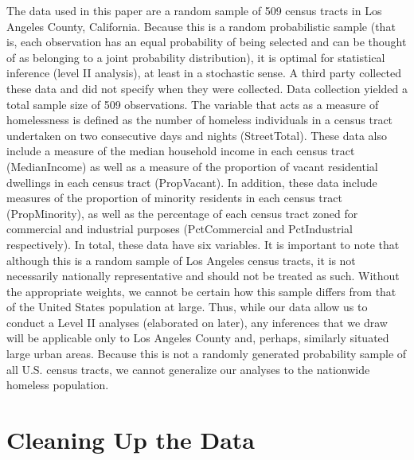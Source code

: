 \documentclass[titlepage]{article}   	%
\begin{document}
\indent The data used in this paper are a random sample of 509 census tracts in Los Angeles County, California. Because this is a random probabilistic sample (that is, each observation has an equal probability of being selected and can be thought of as belonging to a joint probability distribution), it is optimal for statistical inference (level II analysis), at least in a stochastic sense. A third party collected these data and did not specify when they were collected. Data collection yielded a total sample size of 509 observations. The variable that acts as a measure of homelessness is defined as the number of homeless individuals in a census tract undertaken on two consecutive days and nights (StreetTotal). These data also include a measure of the median household income in each census tract (MedianIncome) as well as a measure of the proportion of vacant residential dwellings in each census tract (PropVacant). In addition, these data include measures of the proportion of minority residents in each census tract (PropMinority), as well as the percentage of each census tract zoned for commercial and industrial purposes (PctCommercial and PctIndustrial respectively). In total, these data have six variables. It is important to note that although this is a random sample of Los Angeles census tracts, it is not necessarily nationally representative and should not be treated as such. Without the appropriate weights, we cannot be certain how this sample differs from that of the United States population at large. Thus, while our data allow us to conduct a Level II analyses (elaborated on later), any inferences that we draw will be applicable only to Los Angeles County and, perhaps, similarly situated large urban areas. Because this is not a randomly generated probability sample of all U.S. census tracts, we cannot generalize our analyses to the nationwide homeless population. 

\section{Cleaning Up the Data}
\end{document}
